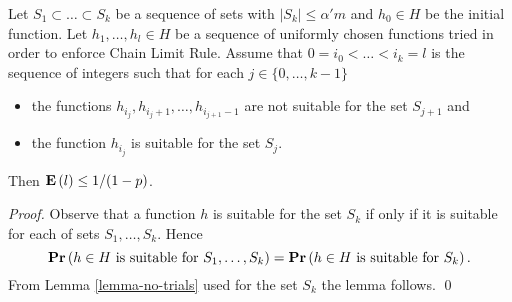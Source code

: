 \begin{lemma}
\label{lemma-sets}
Let $S_1 \subset \dots \subset S_k$ be a sequence of sets with $|S_k| \leq \alpha' m$ and $h_0 \in H$ be the initial function. Let $h_1, \dots, h_l \in H$ be a sequence of uniformly chosen functions tried in order to enforce Chain Limit Rule. Assume that $0 = i_0 < \dots < i_k = l$ is the sequence of integers such that for each $j \in \{0, \dots, k - 1\}$
\begin{itemize}
\item the functions $h_{i_{j}}, h_{i_{j} + 1}, \dots, h_{i_{j + 1} - 1}$ are not suitable for the set $S_{j + 1}$ and 
\item the function $h_{i_{j}}$ is suitable for the set $S_j$.
\end{itemize}
Then $\mathbf{E}\left(l\right) \leq {1}/{(1 - p)}$.
\end{lemma}
\begin{proof}
Observe that a function $h$ is suitable for the set $S_k$ if only if it is suitable for each of sets $S_1, \dots, S_k$. Hence $$\mathbf{Pr}\left(h \in H \text{ is suitable for } S_1, \dots, S_k\right) = \mathbf{Pr}\left(h \in H \text{ is suitable for } S_k\right).$$ From Lemma \ref{lemma-no-trials} used for the set $S_k$ the lemma follows.
\qed
\end{proof}

